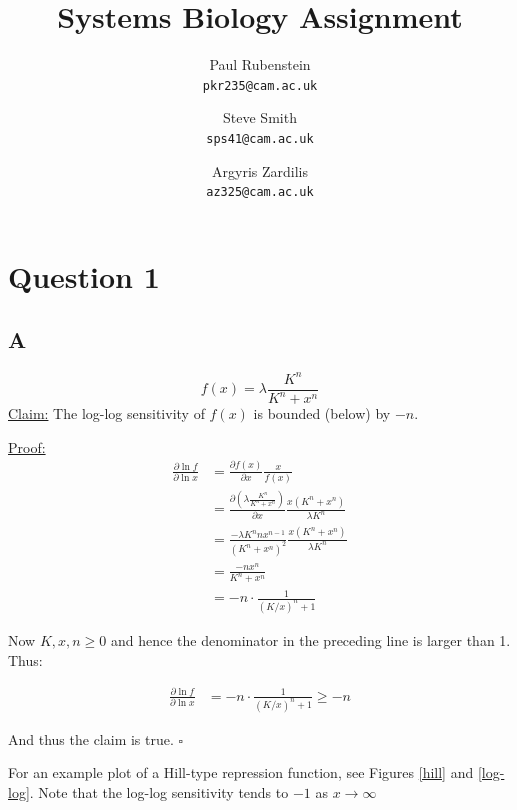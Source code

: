 \documentclass[a4paper,12pt]{article}
\author{Paul Rubenstein\\ \texttt{pkr235@cam.ac.uk} \and Steve Smith \\ \texttt{sps41@cam.ac.uk} \and Argyris Zardilis \\ \texttt{az325@cam.ac.uk}}
\title{Systems Biology Assignment}
\begin{document}
\maketitle

\section*{Question 1}
\subsection*{A}
\[f(x) = \lambda \frac{K^n}{K^n + x^n}\]
\underline{Claim:} The log-log sensitivity of $f(x)$ is bounded (below) by $-n$.

\noindent \underline{Proof:} 
\begin{align*}
\frac{\partial \ln f}{\partial \ln x} & =  \frac{\partial f(x)}{\partial x}\frac{x}{f(x)} \\
& = \frac{\partial (\lambda \frac{K^n}{K^n + x^n})}{\partial x} \frac{x(K^n + x^n)}{\lambda K^n} \\
& = \frac{- \lambda K^n n x^{n-1}}{(K^n + x^n)^2} \frac{x(K^n + x^n)}{\lambda K^n} \\
& = \frac{-n x^n}{K^n + x^n}\\
& = -n \cdot \frac{1}{(K/x)^n+1}
\end{align*}

Now $K, x, n \geq 0$ and hence the denominator in the preceding line is larger than 1. Thus:

\begin{align*}
\frac{\partial \ln f}{\partial \ln x} & = -n \cdot \frac{1}{(K/x)^n+1} \geq -n
\end{align*}

And thus the claim is true. $\square$

For an example plot of a Hill-type repression function, see Figures \ref{hill} and \ref{log-log}. Note that the log-log sensitivity tends to $-1$ as $x\longrightarrow \infty$
\end{document}
